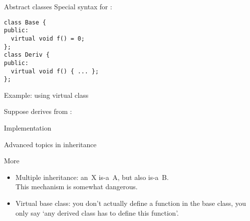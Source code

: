 \begin{block}{Abstract classes}
  Special syntax for :
\begin{verbatim}
class Base {
public:
  virtual void f() = 0;
};
class Deriv {
public:
  virtual void f() { ... };
};
\end{verbatim}
\end{block}

\begin{block}{Example: using virtual class}
  \small
  \begin{multicols}{2}
    \vfill\columnbreak
    Suppose  derives from :\\
  \end{multicols}
\end{block}

\begin{block}{Implementation}
  \footnotesize
  \begin{multicols}{2}
    \vfill\columnbreak
  \end{multicols}
\end{block}

 {Advanced topics in inheritance}

\begin{block}{More}
  \label{sl:obj-more}  
  \begin{itemize}
  \item  Multiple inheritance: an~X is-a~A, but also is-a~B.\\
    This mechanism is somewhat dangerous.
  \item Virtual base class: you don't actually define a function in
    the base class, you only say `any derived class has to define this
    function'.
  \end{itemize}
\end{block}

